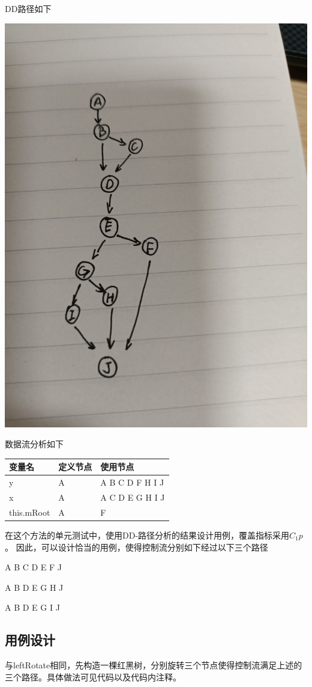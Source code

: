 \documentclass[12pt, a4paper, oneside]{ctexart}
\begin{document}
DD路径如下

\includegraphics[scale=0.2]{screenshots/DD-leftRotate.jpg}

数据流分析如下

\begin{table}[!h]
    \begin{tabular}{|l|l|l|}
    \hline
    变量名 & 定义节点 & 使用节点 \\ \hline
    y & A & A B C D F H I J \\ \hline
    x & A & A C D E G H I J\\ \hline
    this.mRoot & A & F \\ \hline
    \end{tabular}
\end{table}

在这个方法的单元测试中，使用DD-路径分析的结果设计用例，覆盖指标采用$C_1p$。
因此，可以设计恰当的用例，使得控制流分别如下经过以下三个路径

A B C D E F J

A B D E G H J

A B D E G I J

\subsection{用例设计}

与leftRotate相同，先构造一棵红黑树，分别旋转三个节点使得控制流满足上述的三个路径。具体做法可见代码以及代码内注释。
\end{document}
